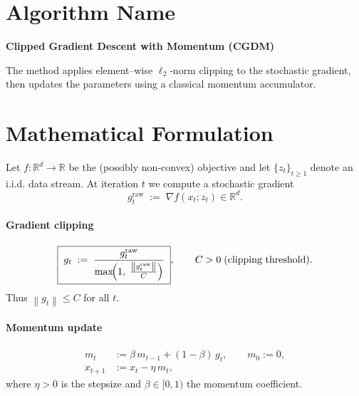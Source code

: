 \documentclass{article}
\newcommand{\R}{\mathbb{R}}
\newcommand{\norm}[1]{\left\|#1\right\|}
\begin{document}
\section*{Algorithm Name}
\textbf{Clipped Gradient Descent with Momentum (CGDM)}  

The method applies element–wise $\ell_2$‑norm clipping to the stochastic gradient, then updates the parameters using a classical momentum accumulator.

\section*{Mathematical Formulation}
Let $f:\R^d\rightarrow\R$ be the (possibly non‑convex) objective and let $\{z_t\}_{t\ge 1}$ denote an i.i.d. data stream.  
At iteration $t$ we compute a stochastic gradient
\[
g_t^{\text{raw}} \;:=\; \nabla f(x_t;z_t)\in\R^d .
\]

\paragraph{Gradient clipping}
\[
\boxed{\;
g_t \;:=\; \frac{g_t^{\text{raw}}}{\max\!\Bigl(1,\;\frac{\norm{g_t^{\text{raw}}}}{C}\Bigr)}\;},
\qquad C>0\;\text{(clipping threshold)}.
\]
Thus $\norm{g_t}\le C$ for all $t$.

\paragraph{Momentum update}
\[
\begin{aligned}
m_t &:= \beta\, m_{t-1} + (1-\beta)\, g_t, \qquad m_0:=0, \\
x_{t+1} &:= x_t - \eta\, m_t ,
\end{aligned}
\]
where $\eta>0$ is the stepsize and $\beta\in[0,1)$ the momentum coefficient.
\end{document}
